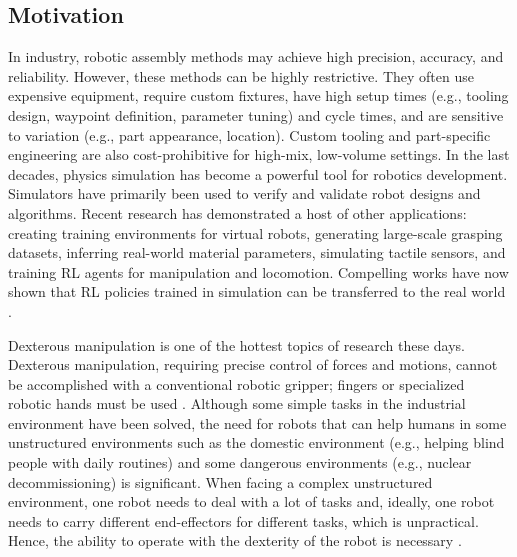 \documentclass[a4paper]{article}
\begin{document}
\subsection{Motivation}
In industry, robotic assembly methods may achieve high precision, accuracy, and reliability. However, these methods can be highly restrictive. They often use expensive equipment, require custom fixtures, have high setup times (e.g., tooling design, waypoint definition, parameter tuning) and cycle times, and are sensitive to variation (e.g., part appearance, location). Custom tooling and part-specific engineering are also cost-prohibitive for high-mix, low-volume settings.
In the last decades, physics simulation has become a powerful tool for robotics development. Simulators have primarily been used to verify and validate robot designs and algorithms. Recent research has demonstrated a host of other applications: creating training environments for virtual robots, generating large-scale grasping datasets, inferring real-world material parameters, simulating tactile sensors, and training RL agents for manipulation and locomotion. Compelling works have now shown that RL policies trained in simulation can be transferred to the real world \cite{narang2022factory}.

Dexterous manipulation is one of the hottest topics of research these days. 
Dexterous manipulation, requiring precise control of forces and motions, cannot be accomplished with a conventional robotic gripper; fingers or specialized robotic hands must be used \cite{844067}. Although some simple tasks in the industrial environment have been solved, the need for robots that can help humans in some unstructured environments such as the domestic environment (e.g., helping blind people with daily routines) and some dangerous environments (e.g., nuclear decommissioning) is significant. When facing a complex unstructured environment, one robot needs to deal with a lot of tasks and, ideally, one robot needs to carry different end-effectors for different tasks, which is unpractical. Hence, the ability to operate with the dexterity of the robot is necessary \cite{10.3389/fnbot.2022.861825}.
\end{document}
